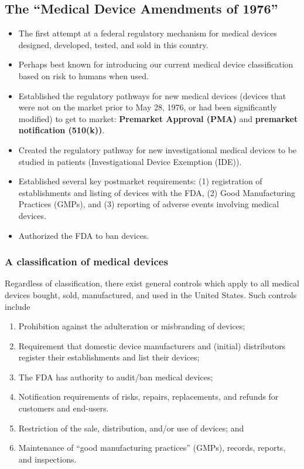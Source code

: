 \documentclass[11pt]{book}
\begin{document}
\subsection{The ``Medical Device Amendments of 1976''}
\begin{itemize}
	\item The first attempt at a federal regulatory mechanism for medical devices designed, developed, tested, and sold in this country.
	\item Perhaps best known for introducing our current medical device classification based on risk to humans when used.
	\item Established the regulatory pathways for new medical devices (devices that were not on the market prior to May 28, 1976, or had been significantly modified) to get to market: \textbf{Premarket Approval (PMA)} and \textbf{premarket notification (510(k))}.
	\item Created the regulatory pathway for new investigational medical devices to be studied in patients (Investigational Device Exemption (IDE)).
	\item Established several key postmarket requirements: (1) registration of establishments and listing of devices with the FDA, (2) Good Manufacturing Practices (GMPs), and (3) reporting of adverse events involving medical devices.
	\item Authorized the FDA to ban devices.
\end{itemize}
\subsubsection{A classification of medical devices}
Regardless of classification, there exist general controls which apply to all medical devices bought, sold, manufactured, and used in the United States. Such controls include
\begin{enumerate}
	\item Prohibition against the adulteration or misbranding of devices;
	\item Requirement that domestic device manufacturers and (initial) distributors register their establishments and list their devices;
	\item The FDA has authority to audit/ban medical devices;
	\item Notification requirements of risks, repairs, replacements, and refunds for customers and end-users.
	\item Restriction of the sale, distribution, and/or use of devices; and
	\item Maintenance of ``good manufacturing practices'' (GMPs), records, reports, and inspections.
\end{enumerate}
\end{document}
